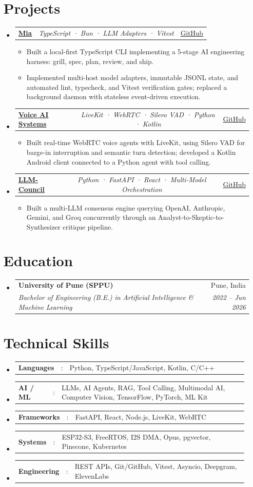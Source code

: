 \documentclass[a4paper,11pt]{article}
\makeatletter
\newcommand{\resumeItem}[1]{\item\small{#1}}
\newcommand{\resumeItemListStart}{\begin{itemize}[rightmargin=0.11in]}
\newcommand{\resumeItemListEnd}{\end{itemize}}
\newcommand{\resumeSectionType}[3]{\item\begin{tabular*}{0.96\textwidth}[t]{p{0.15\linewidth}p{0.02\linewidth}p{0.81\linewidth}}\textbf{#1} & #2 & #3\end{tabular*}\vspace{-2pt}}
\newcommand{\resumeTrioHeading}[3]{\item\small{\begin{tabular*}{0.96\textwidth}[t]{l@{\extracolsep{\fill}}c@{\extracolsep{\fill}}r}\textbf{#1} & \textit{#2} & #3\end{tabular*}}}
\newcommand{\resumeQuadHeading}[4]{\item\begin{tabular*}{0.96\textwidth}[t]{l@{\extracolsep{\fill}}r}\textbf{#1} & #2 \\\textit{\small#3} & \textit{\small #4}\end{tabular*}}
\newcommand{\resumeHeadingListStart}{\begin{itemize}[leftmargin=0.15in, label={}]}
\newcommand{\resumeHeadingListEnd}{\end{itemize}}
\makeatother
\begin{document}
\section{Projects}
\resumeHeadingListStart{}
  \resumeTrioHeading{\href{https://github.com/thesohamdatta/Mia}{\uline{Mia}}}{TypeScript · Bun · LLM Adapters · Vitest}{\href{https://github.com/thesohamdatta/Mia}{\uline{GitHub}}}
    \resumeItemListStart{}
      \resumeItem{Built a local-first TypeScript CLI implementing a 5-stage AI engineering harness: grill, spec, plan, review, and ship.}
      \resumeItem{Implemented multi-host model adapters, immutable JSONL state, and automated lint, typecheck, and Vitest verification gates; replaced a background daemon with stateless event-driven execution.}
    \resumeItemListEnd{}
  \resumeTrioHeading{\href{https://github.com/thesohamdatta/John}{\uline{Voice AI Systems}}}{LiveKit · WebRTC · Silero VAD · Python · Kotlin}{\href{https://github.com/thesohamdatta/John}{\uline{GitHub}}}
    \resumeItemListStart{}
      \resumeItem{Built real-time WebRTC voice agents with LiveKit, using Silero VAD for barge-in interruption and semantic turn detection; developed a Kotlin Android client connected to a Python agent with tool calling.}
    \resumeItemListEnd{}
  \resumeTrioHeading{\href{https://github.com/thesohamdatta/LLM-Council}{\uline{LLM-Council}}}{Python · FastAPI · React · Multi-Model Orchestration}{\href{https://github.com/thesohamdatta/LLM-Council}{\uline{GitHub}}}
    \resumeItemListStart{}
      \resumeItem{Built a multi-LLM consensus engine querying OpenAI, Anthropic, Gemini, and Groq concurrently through an Analyst-to-Skeptic-to-Synthesizer critique pipeline.}
    \resumeItemListEnd{}
\resumeHeadingListEnd{}

\section{Education}
\resumeHeadingListStart{}
  \resumeQuadHeading{University of Pune (SPPU)}{Pune, India}{Bachelor of Engineering (B.E.) in Artificial Intelligence \& Machine Learning}{2022 -- Jun 2026}
\resumeHeadingListEnd{}

\section{Technical Skills}
\resumeHeadingListStart{}
  \resumeSectionType{Languages}{:}{Python, TypeScript/JavaScript, Kotlin, C/C++}
  \resumeSectionType{AI / ML}{:}{LLMs, AI Agents, RAG, Tool Calling, Multimodal AI, Computer Vision, TensorFlow, PyTorch, ML Kit}
  \resumeSectionType{Frameworks}{:}{FastAPI, React, Node.js, LiveKit, WebRTC}
  \resumeSectionType{Systems}{:}{ESP32-S3, FreeRTOS, I2S DMA, Opus, pgvector, Pinecone, Kubernetes}
  \resumeSectionType{Engineering}{:}{REST APIs, Git/GitHub, Vitest, Asyncio, Deepgram, ElevenLabs}
\resumeHeadingListEnd{}
\end{document}

